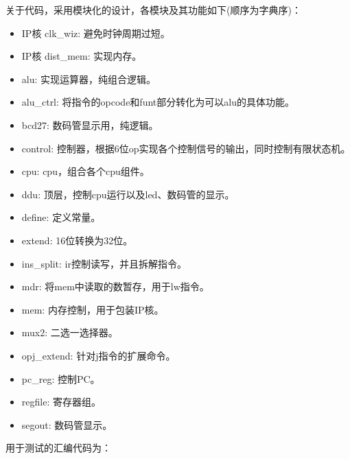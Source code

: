 \documentclass[12pt, a4paper]{article}
\begin{document}
关于代码，采用模块化的设计，各模块及其功能如下(顺序为字典序)：
\begin{itemize}
	\item IP核 clk\_wiz:  避免时钟周期过短。
	\item IP核 dist\_mem: 实现内存。
	\item alu: 实现运算器，纯组合逻辑。
	\item alu\_ctrl: 将指令的opcode和funt部分转化为可以alu的具体功能。
	\item bcd27: 数码管显示用，纯逻辑。
	\item control: 控制器，根据6位op实现各个控制信号的输出，同时控制有限状态机。
	\item cpu: cpu，组合各个cpu组件。
	\item ddu: 顶层，控制cpu运行以及led、数码管的显示。
	\item define: 定义常量。
	\item extend: 16位转换为32位。
	\item ins\_split: ir控制读写，并且拆解指令。
	\item mdr: 将mem中读取的数暂存，用于lw指令。
	\item mem: 内存控制，用于包装IP核。
	\item mux2: 二选一选择器。
	\item opj\_extend: 针对j指令的扩展命令。
	\item pc\_reg: 控制PC。
	\item regfile: 寄存器组。
	\item segout: 数码管显示。
\end{itemize}
\clearpage 
用于测试的汇编代码为：
\end{document}
